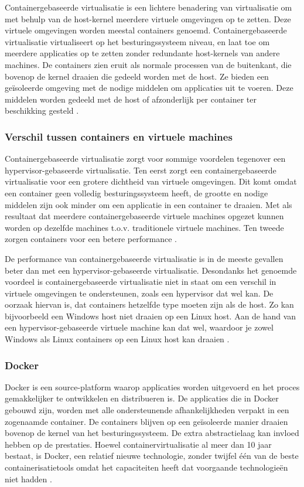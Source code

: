 Containergebaseerde virtualisatie is een lichtere benadering van virtualisatie om met behulp van de host-kernel meerdere virtuele omgevingen op te zetten. Deze virtuele omgevingen worden meestal containers genoemd. Containergebaseerde virtualisatie virtualiseert op het besturingssysteem niveau, en laat toe om meerdere applicaties op te zetten zonder redundante host-kernels van andere machines. De containers zien eruit als normale processen van de buitenkant, die bovenop de kernel draaien die gedeeld worden met de host. Ze bieden een geïsoleerde omgeving met de nodige middelen om applicaties uit te voeren. Deze middelen worden gedeeld met de host of afzonderlijk per container ter beschikking gesteld \autocite{Thanh2015}.

\subsubsection{Verschil tussen containers en virtuele machines}
Containergebaseerde virtualisatie zorgt voor sommige voordelen tegenover een hypervisor-gebaseerde virtualisatie. Ten eerst zorgt een containergebaseerde virtualisatie voor een grotere dichtheid van virtuele omgevingen. Dit komt omdat een container geen volledig besturingssysteem heeft, de grootte en nodige middelen zijn ook minder om een applicatie in een container te draaien. Met als resultaat dat meerdere containergebaseerde virtuele machines opgezet kunnen worden op dezelfde machines t.o.v. traditionele virtuele machines. Ten tweede zorgen containers voor een betere performance \autocite{Ruiz2015}.

De performance van containergebaseerde virtualisatie is in de meeste gevallen beter dan met een hypervisor-gebaseerde virtualisatie. Desondanks het genoemde voordeel is containergebaseerde virtualisatie niet in staat om een verschil in virtuele omgevingen te ondersteunen, zoals een hypervisor dat wel kan. De oorzaak hiervan is, dat containers hetzelfde type moeten zijn als de host. Zo kan bijvoorbeeld een Windows host niet draaien op een Linux host. Aan de hand van een hypervisor-gebaseerde virtuele machine kan dat wel, waardoor je zowel Windows als Linux containers op een Linux host kan draaien \autocite{Ruiz2015}.

\subsubsection{Docker}
Docker is een source-platform waarop applicaties worden uitgevoerd en het proces gemakkelijker te ontwikkelen en distribueren is. De applicaties die in Docker gebouwd zijn, worden met alle ondersteunende afhankelijkheden verpakt in een zogenaamde container. De containers blijven op een geïsoleerde manier draaien bovenop de kernel van het besturingssysteem. De extra abstractielaag kan invloed hebben op de prestaties. Hoewel containervirtualisatie al meer dan 10 jaar bestaat, is Docker, een relatief nieuwe technologie, zonder twijfel één van de beste containerisatietools omdat het capaciteiten heeft dat voorgaande technologieën niet hadden \autocite{Rad2017}.

